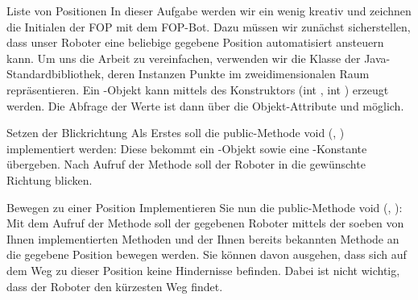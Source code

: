 \documentclass{../preamble}
\begin{document}
\clearpage

\begin{task}[credit = \stars{3}{3}]{Liste von Positionen}
    In dieser Aufgabe werden wir ein wenig kreativ und zeichnen die Initialen der FOP mit dem FOP-Bot. Dazu müssen wir zunächst sicherstellen, dass unser Roboter eine beliebige gegebene Position automatisiert ansteuern kann.
    \br
    Um uns die Arbeit zu vereinfachen, verwenden wir die Klasse  der Java-Standardbibliothek, deren Instanzen Punkte im zweidimensionalen Raum repräsentieren. Ein -Objekt kann mittels des Konstruktors (\textcolor{keywordcolor}{int} , \textcolor{keywordcolor}{int} ) erzeugt werden. Die Abfrage der Werte ist dann über die Objekt-Attribute  und  möglich.

    \begin{subtask*}{Setzen der Blickrichtung}
        Als Erstes soll die \textcolor{keywordcolor}{public}-Methode \textcolor{keywordcolor}{void} (, ) implementiert werden: Diese bekommt ein -Objekt sowie eine -Konstante übergeben. Nach Aufruf der Methode soll der Roboter in die gewünschte Richtung blicken.

        \begin{solution}
            
        \end{solution}
    \end{subtask*}

    \clearpage

    \begin{subtask*}{Bewegen zu einer Position}
        Implementieren Sie nun die \textcolor{keywordcolor}{public}-Methode \textcolor{keywordcolor}{void} (, ): Mit dem Aufruf der Methode soll der gegebenen Roboter mittels der soeben von Ihnen implementierten Methoden  und der Ihnen bereits bekannten Methode  an die gegebene Position bewegen werden. Sie können davon ausgehen, dass sich auf dem Weg zu dieser Position keine Hindernisse befinden. Dabei ist nicht wichtig, dass der Roboter den kürzesten Weg findet.

        \begin{solution}
            
        \end{solution}
    \end{subtask*}


\end{task}
\end{document}
